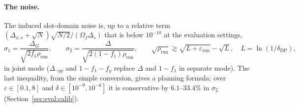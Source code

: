 \documentclass[11pt]{article}
\theoremstyle{definition}
\theoremstyle{plain}
\begin{document}
\paragraph{The noise.} The induced slot-domain noise is, up to a relative term $(\Delta_{x,s} + \sqrt N)\sqrt{N/2}/(\Omega_f\Delta_s)$ that is below $10^{-10}$ at the evaluation settings,
\begin{equation}
  \sigma_1 = \frac{\Delta_G}{\sqrt{2 f_1\rho_{\mathrm{run}}}}, \qquad
  \sigma_2 = \frac{\Delta}{\sqrt{2(1 - f_1)\rho_{\mathrm{run}}}}, \qquad
  \sqrt{\rho_{\mathrm{run}}} \gtrsim \sqrt{L + \varepsilon_{\mathrm{run}}} - \sqrt L, \quad L = \ln(1/\delta_{\mathrm{DP}}),
  \label{eq:sigmas}
\end{equation}
in joint mode ($\Delta_{\neg yy}$ and $1 - f_1 - f_y$ replace $\Delta$ and $1 - f_1$ in separate mode). The last inequality, from the simple conversion, gives a planning formula; over $\varepsilon \in [0.1, 8]$ and $\delta \in [10^{-9}, 10^{-6}]$ it is conservative by $6.1$--$33.4\%$ in $\sigma_2$ (Section~\ref{sec:eval:calib}).
\end{document}

